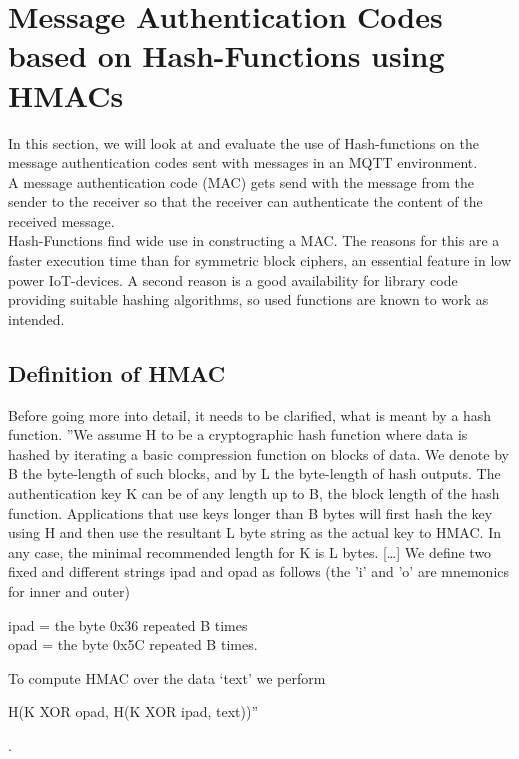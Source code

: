 \section{Message Authentication Codes based on Hash-Functions using HMACs}
In this section, we will look at and evaluate the use of Hash-functions on the
message authentication codes sent with messages in an MQTT environment.\\
A message authentication code (MAC) gets send with the message from the
sender to the receiver so that the receiver can authenticate the content of the
received message.\\
Hash-Functions find wide use in constructing a MAC. The reasons for this are
a faster execution time than for symmetric block ciphers, an essential feature
in low power IoT-devices. A second reason is a good availability for library code
providing suitable hashing algorithms, so used functions are known to work as
intended.
 
\subsection{Definition of HMAC}
Before going more into detail, it needs to be clarified, what is meant by a hash function. ''We assume H to be a cryptographic hash function where data is hashed by iterating a basic compression function on blocks of data. We denote by B the byte-length of such blocks, and by L the byte-length of hash outputs. The authentication key K can be of any length up to B, the block length of the hash function. Applications that use keys longer than B bytes will first hash the key using H and then use the resultant L byte string as the actual key to HMAC. In any case, the minimal recommended length for K is L bytes. [\dots] We define two fixed and different strings ipad and opad as follows (the ’i’ and ’o’ are mnemonics for inner and outer)
\begin{center}
ipad = the byte 0x36 repeated B times \\
opad = the byte 0x5C repeated B times.
\end{center}
To compute HMAC over the data ‘text’ we perform 
\begin{center}
H(K XOR opad, H(K XOR ipad, text))''
\end{center}
\cite{RFC}.  \\

